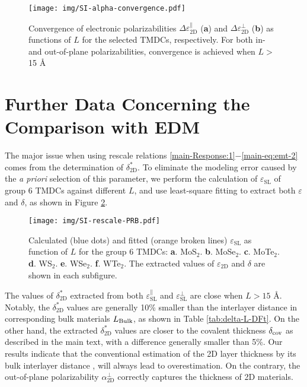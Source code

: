 \documentclass[journal=ancac3,email=true,hyperref=true,keywords=false]{achemso}
\begin{document}
\begin{figure}[htbp]
  \centering
  \texttt{[image: img/SI-alpha-convergence.pdf]}
  \caption{Convergence of electronic polarizabilities
    $\Delta \varepsilon_{\mathrm{2D}}^{\parallel}$ (\textbf{a}) and
    $\Delta \varepsilon_{\mathrm{2D}}^{\perp}$ (\textbf{b}) as
    functions of $L$ for the selected TMDCs, respectively. For both
    in- and out-of-plane polarizabilities, convergence is achieved
    when $L >$15 \AA{}}
  \label{fig:alpha-converg}
\end{figure}


\pagebreak{}
\section{Further Data Concerning the Comparison with EDM}
\label{sec:2D-3D-rescale}

The major issue when using rescale
relations \ref{main-Response:1}$-$\ref{main-eq:emt-2} comes from the determination of $\delta_{\mathrm{2D}}^{*}$. To
eliminate the modeling error caused by the \textit{a priori} selection of this parameter, 
we perform the calculation of
$\varepsilon_{\mathrm{SL}}$ of group 6 TMDCs against different $L$,
and use least-square fitting to extract both
$\varepsilon$ and $\delta$, as shown in
Figure \ref{fig:rescale-prb}.
%
\begin{figure}[htbp]
  \centering
  \texttt{[image: img/SI-rescale-PRB.pdf]}
  \caption{ Calculated (blue dots) and fitted
    (orange broken lines) $\varepsilon_{\mathrm{SL}}$ as function of
    $L$ for the group 6 TMDCs:
    \textbf{a}. MoS$_{2}$. \textbf{b}. MoSe$_{2}$. \textbf{c}.
    MoTe$_{2}$. \textbf{d}. WS$_{2}$. \textbf{e}. WSe$_{2}$. \textbf{f}.
    WTe$_{2}$. The extracted values of $\varepsilon_{\mathrm{2D}}$ and
    $\delta$ are shown in each subfigure.}
  \label{fig:rescale-prb}
\end{figure}
%
The values of $\delta_{\mathrm{2D}}^{*}$ extracted
from both $\varepsilon_{\mathrm{SL}}^{\parallel}$ and
$\varepsilon_{\mathrm{SL}}^{\perp}$ are close when $L> 15$
{\AA}. Notably, the $\delta_{\mathrm{2D}}^{*}$ values are generally 10\%
smaller than the interlayer distance in corresponding bulk materials
$L_{\mathrm{\rm Bulk}}$, as shown in Table \ref{tab:delta-L-DFt}. On the
other hand, the extracted $\delta_{\mathrm{2D}}^{*}$ values are closer to
the covalent thickness $\delta_{\rm cov}$ as
described in the main text, with a difference generally smaller than
5\%. Our results indicate that the conventional estimation of the 2D
layer thickness by its bulk interlayer distance
\cite{Matthes_2016,Laturia_2018}, will always lead to
overestimation. On the contrary, the out-of-plane polarizability
$\alpha_{\mathrm{2D}}^{\perp}$ correctly captures the thickness 
of 2D materials.
\end{document}
